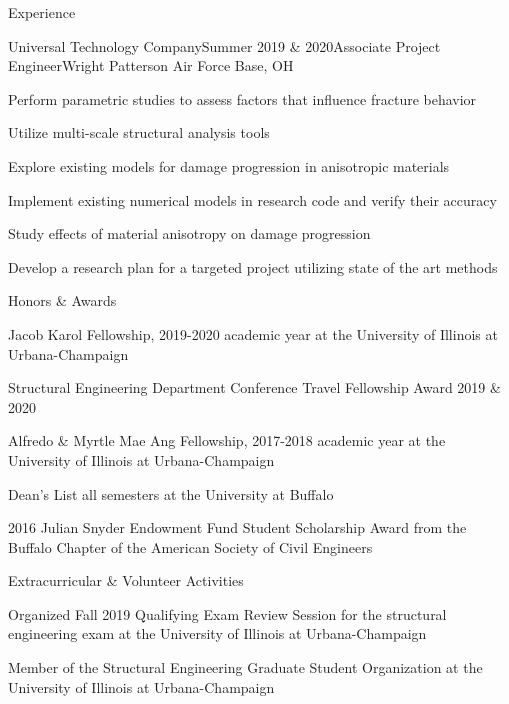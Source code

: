 \documentclass{resume} %
\begin{document}
\begin{rSection}{Experience}
\begin{rSubsection}{Universal Technology Company}{Summer 2019 \& 2020}{Associate Project Engineer}{Wright Patterson Air Force Base, OH}
\item Perform parametric studies to assess factors that influence fracture behavior
\item Utilize multi-scale structural analysis tools
\item Explore existing models for damage progression in anisotropic materials
\item Implement existing numerical models in research code and verify their accuracy
\item Study effects of material anisotropy on damage progression
\item Develop a research plan for a targeted project utilizing state of the art methods
\end{rSubsection}

\end{rSection}


\begin{rSection}{Honors \& Awards}{}
\begin{rSubsection}{}{}{}{}
\item Jacob Karol Fellowship, 2019-2020 academic year at the University of Illinois at Urbana-Champaign
\item Structural Engineering Department Conference Travel Fellowship Award 2019 \& 2020
\item Alfredo \& Myrtle Mae Ang Fellowship, 2017-2018 academic year at the University of Illinois at Urbana-Champaign
\item Dean's List all semesters at the University at Buffalo
\item 2016 Julian Snyder Endowment Fund Student Scholarship Award from the Buffalo Chapter of the American Society of Civil Engineers
\end{rSubsection}
\end{rSection}


\begin{rSection}{Extracurricular \& Volunteer Activities}{}
\begin{rSubsection}{}{}{}{}
\item Organized Fall 2019 Qualifying Exam Review Session for the structural engineering exam at the University of Illinois at Urbana-Champaign
\item Member of the Structural Engineering Graduate Student Organization at the University of Illinois at Urbana-Champaign
\end{rSubsection}
\end{rSection}
\end{document}
